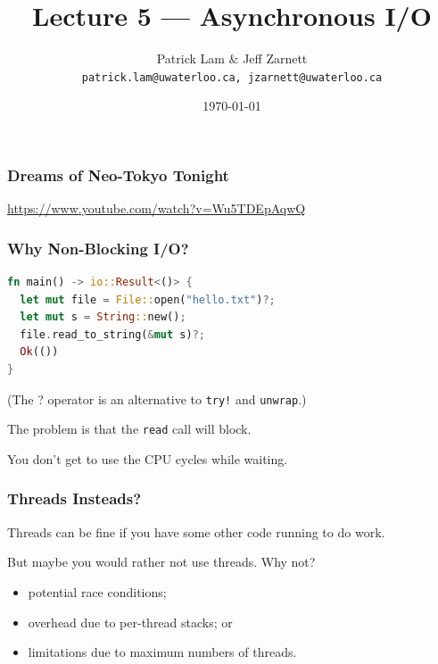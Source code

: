 

\title{Lecture 5 --- Asynchronous I/O}

\author{Patrick Lam \& Jeff Zarnett \\ \small \texttt{patrick.lam@uwaterloo.ca, jzarnett@uwaterloo.ca}}
\date{\today}




\begin{frame}
  \titlepage

 \end{frame}


\begin{frame}
\frametitle{Dreams of Neo-Tokyo Tonight}

\begin{center}
\end{center}

\url{https://www.youtube.com/watch?v=Wu5TDEpAqwQ}

\end{frame}


\begin{frame}[fragile]
\frametitle{Why Non-Blocking I/O?}

\begin{lstlisting}[language=Rust]
fn main() -> io::Result<()> {
  let mut file = File::open("hello.txt")?;
  let mut s = String::new();
  file.read_to_string(&mut s)?;
  Ok(()) 
}
\end{lstlisting}


(The ? operator is an alternative to
\texttt{try!} and \texttt{unwrap}.)


The problem is that the {\tt read} call will \alert{block}.

You don't get to use the CPU cycles while waiting.
\end{frame}


\begin{frame}
\frametitle{Threads Insteads?}

Threads can be fine if you have some other code running to do work.


But maybe you would rather not use threads. Why not?

\begin{itemize}
\item potential race conditions;
\item overhead due to per-thread stacks; or
\item limitations due to maximum numbers of threads.
\end{itemize}

\end{frame}


